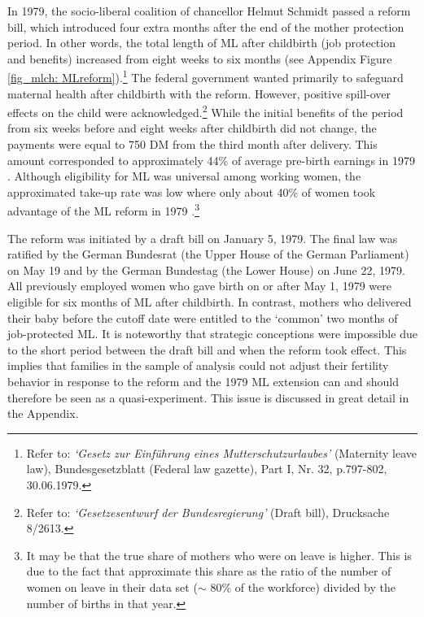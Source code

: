 In 1979, the socio-liberal coalition of chancellor Helmut Schmidt passed a reform bill, which introduced four extra months after the end of the mother protection period. In other words, the total length of ML after childbirth (job protection and benefits) increased from eight weeks to six months (see Appendix Figure \ref{fig_mlch: MLreform}).\footnote{Refer to: \textit{`Gesetz zur Einführung eines Mutterschutzurlaubes'} (Maternity leave law), Bundesgesetzblatt (Federal law gazette), Part I, Nr. 32, p.797-802, 30.06.1979.} The federal government wanted primarily to safeguard maternal health after childbirth with the reform. However, positive spill-over effects on the child were acknowledged.\footnote{Refer to: \textit{`Gesetzesentwurf der Bundesregierung'} (Draft bill), Drucksache 8/2613.} While the initial benefits of the period from six weeks before and eight weeks after childbirth did not change, the payments were equal to 750 DM from the third month after delivery. This amount corresponded to approximately 44\% of average pre-birth earnings in 1979 \citep{schonberg2014expansions}. Although eligibility for ML was universal among working women, the approximated take-up rate was low where only about 40\% of women took advantage of the ML reform in 1979 \citep{Dustmann2012}.\footnote{It may be that the true share of mothers who were on leave is higher. This is due to the fact that \cite{Dustmann2012} approximate this share as the ratio of the number of women on leave in their data set ($\sim$ 80\% of the workforce) divided by the number of births in that year.}


The reform was initiated by a draft bill on January 5, 1979. The final law was ratified by the German Bundesrat (the Upper House of the German Parliament) on May 19 and by the German Bundestag (the Lower House) on June 22, 1979. All previously employed women who gave birth on or after May 1, 1979 were eligible for six months of ML after childbirth. In contrast, mothers who delivered their baby before the cutoff date were entitled to the `common' two months of job-protected ML. It is noteworthy that strategic conceptions were impossible due to the short period between the draft bill and when the reform took effect. This implies that families in the sample of analysis could not adjust their fertility behavior in response to the reform and the 1979 ML extension can and should therefore be seen as a quasi-experiment. This issue is discussed in great detail in the Appendix.


